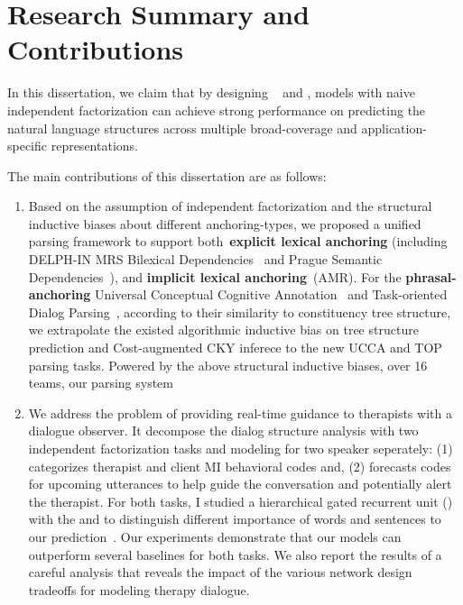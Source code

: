 \section[Research Summary and Contributions]{Research Summary and Contributions}
\label{sec:conclustions:claims}

In this dissertation, we claim that by designing ~ and ,
models with naive independent factorization can achieve strong
performance on predicting the natural language structures across
multiple broad-coverage and application-specific representations.

The main contributions of this dissertation are as follows:

\begin{enumerate}
\item Based on the assumption of independent factorization and the
  structural inductive biases about different anchoring-types, we
  proposed a unified parsing framework to support
  both~\textbf{explicit lexical anchoring} (including DELPH-IN MRS
  Bilexical Dependencies~\citep[DM,][]{ivanova2012did} and Prague
  Semantic
  Dependencies~\citep[PSD,][]{hajic2012announcing,miyao2014house}),
  and \textbf{implicit lexical anchoring}~(AMR). For the
  \textbf{phrasal-anchoring} Universal Conceptual Cognitive
  Annotation~\citep[UCCA,][]{abend2013universal} and Task-oriented
  Dialog Parsing~\citep[TOP,][]{gupta-etal-2018-semantic-parsing},
  according to their similarity to constituency tree structure, we
  extrapolate the existed algorithmic inductive bias on tree structure
  prediction and Cost-augmented CKY inferece to the new UCCA and TOP
  parsing tasks. Powered by the above structural inductive biases,
  over 16 teams, our parsing system~\citep{cao2019amazon} 

\item We address the problem of providing real-time guidance to
  therapists with a dialogue observer. It decompose the dialog
  structure analysis with two independent factorization tasks and
  modeling for two speaker seperately: (1) categorizes therapist and
  client MI behavioral codes and, (2) forecasts codes for upcoming
  utterances to help guide the conversation and potentially alert the
  therapist. For both tasks, I studied a hierarchical gated recurrent
  unit (\HGRU) with the  and
   to distinguish different importance of
  words and sentences to our
  prediction~\citep{jie2019psycdialacl}. Our experiments demonstrate
  that our models can outperform several baselines for both tasks.  We
  also report the results of a careful analysis that reveals the
  impact of the various network design tradeoffs for modeling therapy
  dialogue.


\end{enumerate}
